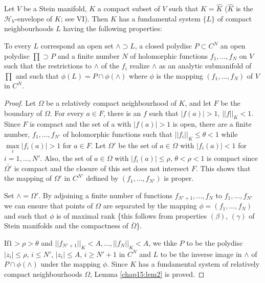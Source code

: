 \begin{lem}\label{chap15:lem2}
Let $V$ be a Stein manifold, $K$ a compact subset of $V$ such that $K
=\hat{K}$ ($\hat{K}$ is the $\mathscr{H}_V$-envelope of $K$; see
VI). Then $K$ has a fundamental system $\{L\}$ of compact
neighbourhoods $L$ having the following properties:

To every $L$ correspond an open set $\wedge \supset L$, a closed
polydisc $P\subset C^N$ an open polydisc $\prod \supset P$ and a
finite number $N$ of holomorphic functions $f_1, \ldots, f_N$ on $V$
such that the restrictions to $\wedge$ of the $f_i$ realize $\wedge$
as an analytic submanifold of $\prod$ and such that $\phi(L) = P \cap
\phi(\wedge)$ where $\phi$ is the mapping $(f_1, \ldots, f_N)$ of $V$
in $C^N$. 
\end{lem}

\begin{proof}
Let $\Omega$ be a relatively compact neighbourhood of $K$, and let $F$
be the boundary of $\Omega$. For every $a \in F$, there is an $f$ such
that $|f(a)|>1$, $||f||_K < 1$. Since $F$ is compact and the set of a
with $|f(a)|>1$ is open, there are a finite number, $f_1, \ldots,
f_{N'}$ of holomorphic functions such that $||f_i||_K \leq \theta <1$
while $\max\limits_i |f_i(a)|>1$ for $a \in F$. Let $\Omega'$ be the
set of $a \in \Omega$ with $|f_i(a)| <1$ for $i = 1, \ldots,
N'$. Also, the set of $a \in \Omega$ with $|f_i(a)| \leq \rho$,
$\theta < \rho < 1$ is compact since $\bar{\Omega'}$ is compact and
the closure of this set does not intersect $F$. This shows that the
mapping of $\Omega'$ in $C^{N'}$ defined by $(f_1, \ldots, f_{N'})$ is
proper. 

Set $\wedge = \Omega'$. By adjoining a finite number of functions
$f_{N'+1}, \ldots, f_N$ to $f_1, \ldots, f_{N'}$ we can ensure that
points of $\Omega$ are separated by the mapping $\phi = (f_1, \ldots,
f_N)$ and such that $\phi$ is of maximal rank \{this follows from
properties $(\beta)$, $(\gamma)$ of Stein manifolds and the
compactness of $\bar{\Omega}$\}.

If\pageoriginale $1 > \rho >\theta$ and $||f_{N'+1}||_K < A, \ldots,
||f_N||_K<A$, we thke $P$ to be the polydisc $|z_i| \leq \rho$, $i
\leq N'$, $|z_i| \leq A$, $i \geq N'+1$ in $C^N$ and $L$ to be the
inverse image in $\wedge$ of $P \cap \phi(\wedge)$ under the mapping
$\phi$. Since $K$ has a fundamental system of relatively compact
neighbourhoods $\Omega$, Lemma \ref{chap15:lem2} is proved. 
\end{proof}

